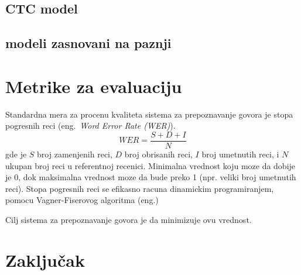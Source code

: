 \documentclass[a4paper]{article}
\begin{document}

\subsection{CTC model}
\subsection{modeli zasnovani na paznji}

\section{Metrike za evaluaciju}
Standardna mera za procenu kvaliteta sistema za prepoznavanje govora je stopa pogresnih reci (eng.~{\em Word Error Rate (WER)}).
\begin{equation*}
  WER = \frac{S + D + I}{N}
\end{equation*}
gde je $S$ broj zamenjenih reci, $D$ broj obrisanih reci, $I$ broj umetnutih reci, i $N$ ukupan broj reci u referentnoj recenici.
Minimalna vrednost koju moze da dobije je 0, dok maksimalna vrednost moze da bude preko 1 (npr. veliki broj umetnutih reci).
Stopa pogresnih reci se efikasno racuna dinamickim programiranjem, pomocu Vagner-Fiserovog algoritma (eng.)

Cilj sistema za prepoznavanje govora je da minimizuje ovu vrednost.

\section{Zaključak}
\label{sec:zakljucak}

\end{document}
